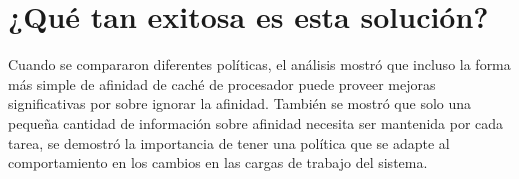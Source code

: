 \section{¿Qué tan exitosa es esta solución?} 
Cuando se compararon diferentes políticas, el análisis mostró que incluso la forma más simple de afinidad de caché de procesador puede proveer mejoras significativas por sobre ignorar la afinidad. También se mostró que solo una pequeña cantidad de información sobre afinidad necesita ser mantenida por cada tarea, se demostró la importancia de tener una política que se adapte al comportamiento en los cambios en las cargas de trabajo del sistema.
























